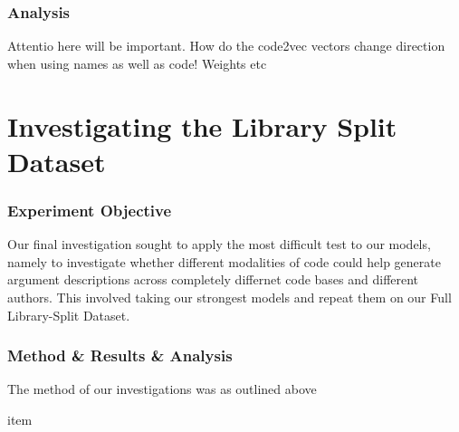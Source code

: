 \subsubsection{Analysis} %




Attentio here will be important. 
How do the code2vec vectors change direction when using names as well as code!
Weights etc


\section{Investigating the Library Split Dataset} %
\label{sec:analysis}

\subsubsection{Experiment Objective} %

Our final investigation sought to apply the most difficult test to our models, namely to investigate whether different modalities of code could help generate argument descriptions across completely differnet code bases and different authors.
This involved taking our strongest models and repeat them on our Full Library-Split Dataset.

\subsubsection{Method \& Results \& Analysis} %

The method of our investigations was as outlined above

item 


